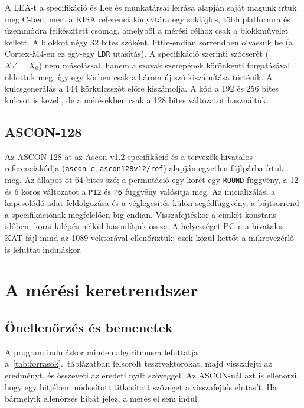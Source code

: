 \documentclass[a4paper,12pt]{report}
\theoremstyle{definition}
\theoremstyle{remark}
\begin{document}
A LEA-t a specifikáció \cite{Hong2013} és Lee és munkatársai leírása \cite{Lee2014} alapján saját magunk írtuk meg C-ben, mert a KISA referenciakönyvtára egy sokfájlos, több platformra és üzemmódra felkészített csomag, amelyből a mérési célhoz csak a blokkművelet kellett. A blokkot négy 32 bites szóként, little-endian sorrendben olvassuk be (a Cortex-M4-en ez egy-egy \texttt{LDR} utasítás). A specifikáció szerinti szócserét ($X_3' = X_0$) nem másolással, hanem a szavak szerepének körönkénti forgatásával oldottuk meg, így egy körben csak a három új szó kiszámítása történik. A kulcsgenerálás a 144 körkulcsszót előre kiszámolja. A kód a 192 és 256 bites kulcsot is kezeli, de a mérésekben csak a 128 bites változatot használtuk.

\subsection{ASCON-128}

Az ASCON-128-at az Ascon v1.2 specifikáció \cite{Dobraunig2021} és a tervezők hivatalos referenciakódja (\texttt{ascon-c}, \texttt{ascon128v12/ref}) \cite{AsconC} alapján egyetlen fájlpárba írtuk meg. Az állapot öt 64 bites szó; a permutáció egy körét egy \texttt{ROUND} függvény, a 12 és 6 körös változatot a \texttt{P12} és \texttt{P6} függvény valósítja meg. Az inicializálás, a kapcsolódó adat feldolgozása és a véglegesítés külön segédfüggvény, a bájtsorrend a specifikációnak megfelelően big-endian. Visszafejtéskor a címkét konstans időben, korai kilépés nélkül hasonlítjuk össze. A helyességet PC-n a hivatalos KAT-fájl mind az 1089 vektorával ellenőriztük; ezek közül kettőt a mikrovezérlő is lefuttat induláskor.

\section{A mérési keretrendszer}\label{sec:keretrendszer}

\subsection{Önellenőrzés és bemenetek}

A program induláskor minden algoritmusra lefuttatja a~\ref{tab:forrasok}.~táblázatban felsorolt tesztvektorokat, majd visszafejti az eredményt, és összeveti az eredeti nyílt szöveggel. Az ASCON-nál azt is ellenőrzi, hogy egy bitjében módosított titkosított szöveget a visszafejtés elutasít. Ha bármelyik ellenőrzés hibát jelez, a mérés el sem indul.
\end{document}
